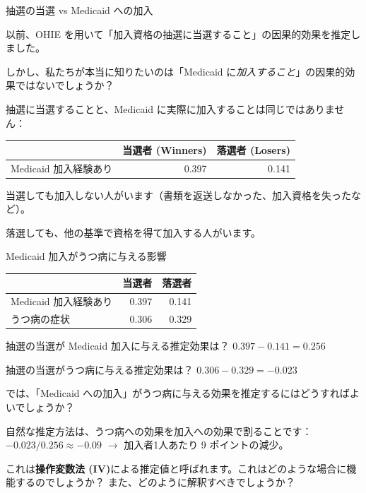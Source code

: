 \documentclass[11pt,handout]{beamer}
\newenvironment{wideitemize}{\itemize\addtolength{\itemsep}{10pt}}{\enditemize}
\begin{document}
	\begin{frame}{抽選の当選 vs Medicaid への加入}
		\begin{wideitemize}
			\item
			以前、OHIE を用いて「加入資格の抽選に当選すること」の因果的効果を推定しました。
			
			\item
			しかし、私たちが本当に知りたいのは「Medicaid に\textit{加入すること}」の因果的効果ではないでしょうか？ 
			
			\pause
			\item
			抽選に当選することと、Medicaid に実際に加入することは同じではありません： \medskip
			
			\begin{tabular}{lrr}
				& 当選者 (Winners) & 落選者 (Losers) \\ \hline
				Medicaid 加入経験あり & 0.397 & 0.141
			\end{tabular}
			
			\pause
			\item
			当選しても加入しない人がいます（書類を返送しなかった、加入資格を失ったなど）。
			
			\item
			落選しても、他の基準で資格を得て加入する人がいます。
		\end{wideitemize}
	\end{frame}


	\begin{frame}{Medicaid 加入がうつ病に与える影響}
		
			\begin{tabular}{lrr}
			& 当選者 & 落選者 \\ \hline
			Medicaid 加入経験あり & 0.397 & 0.141 \\
		   うつ病の症状 & 0.306 &  0.329 
		   \end{tabular}
	
	
	\begin{wideitemize}
		\item
		抽選の当選が Medicaid 加入に与える推定効果は？ \pause $0.397-0.141 = 0.256$
		
		\pause
		\item
		抽選の当選がうつ病に与える推定効果は？ \pause $0.306 - 0.329 = -0.023$
		
		\pause
		\item
		では、「Medicaid への加入」がうつ病に与える効果を推定するにはどうすればよいでしょうか？
		
		\pause
		\item
		自然な推定方法は、うつ病への効果を加入への効果で割ることです： $-0.023 / 0.256 \approx -0.09$ $\rightarrow$ 加入者1人あたり 9 ポイントの減少。
		
		\pause
		\item
		これは\textbf{操作変数法 (IV)}による推定値と呼ばれます。これはどのような場合に機能するのでしょうか？ また、どのように解釈すべきでしょうか？
	\end{wideitemize}
	
	\end{frame}
\end{document}
